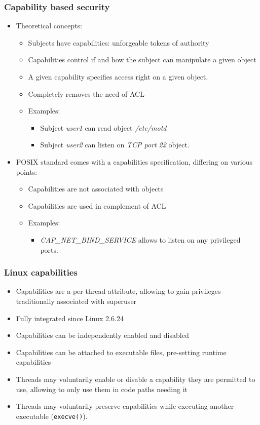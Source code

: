 \begin{frame}
	\frametitle{Capability based security}
	\begin{itemize}
		\item Theoretical concepts:
			\begin{itemize}
				\item Subjects have capabilities: unforgeable tokens of authority
				\item Capabilities control if and how the subject can manipulate a given object
				\item A given capability specifies access right on a given object.
				\item Completely removes the need of ACL
				\item Examples:
					\begin{itemize}
						\item Subject \emph{user1} can read object \emph{/etc/motd}
						\item Subject \emph{user2} can listen on \emph{TCP port 22} object.
					\end{itemize}
			\end{itemize}
		\item POSIX standard comes with a capabilities specification, differing on
			various points:
			\begin{itemize}
				\item Capabilities are not associated with objects
				\item Capabilities are used in complement of ACL
				\item Examples:
					\begin{itemize}
						\item \emph{CAP\_NET\_BIND\_SERVICE} allows to listen on any privileged
							ports.
					\end{itemize}
			\end{itemize}
	\end{itemize}
\end{frame}


\begin{frame}
	\frametitle{Linux capabilities}
	\begin{itemize}
		\item Capabilities are a per-thread attribute, allowing to gain privileges
			traditionally associated with superuser
		\item Fully integrated since Linux 2.6.24
		\item Capabilities can be independently enabled and disabled
		\item Capabilities can be attached to executable files, pre-setting runtime
			capabilities
		\item Threads may voluntarily enable or disable a capability they are
			permitted to use, allowing to only use them in code paths needing it
		\item Threads may voluntarily preserve capabilities while executing another
			executable (\texttt{execve()}).
	\end{itemize}
\end{frame}

